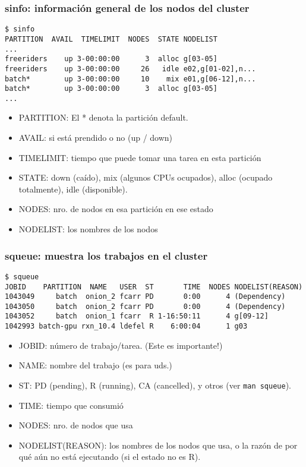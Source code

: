 \documentclass[handout]{beamer}
\begin{document}
\begin{frame}[fragile]
\frametitle{sinfo: información general de los nodos del cluster}

\begin{verbatim}
$ sinfo
PARTITION  AVAIL  TIMELIMIT  NODES  STATE NODELIST
...
freeriders    up 3-00:00:00      3  alloc g[03-05]
freeriders    up 3-00:00:00     26   idle e02,g[01-02],n...
batch*        up 3-00:00:00     10    mix e01,g[06-12],n...
batch*        up 3-00:00:00      3  alloc g[03-05]
...
\end{verbatim}
\begin{itemize}
  \item PARTITION: El * denota la partición default.
  \item AVAIL: si está prendido o no (up / down)
  \item TIMELIMIT: tiempo que puede tomar una tarea en esta partición
  \item STATE: down (caído), mix (algunos CPUs ocupados), alloc (ocupado totalmente), idle (disponible).
  \item NODES: nro. de nodos en esa partición en ese estado
  \item NODELIST: los nombres de los nodos
\end{itemize}
\end{frame}



\begin{frame}[fragile]
\frametitle{squeue: muestra los trabajos en el cluster}

\begin{verbatim}
$ squeue
JOBID    PARTITION  NAME   USER  ST       TIME  NODES NODELIST(REASON)
1043049     batch  onion_2 fcarr PD       0:00      4 (Dependency)
1043050     batch  onion_2 fcarr PD       0:00      4 (Dependency)
1043052     batch  onion_1 fcarr  R 1-16:50:11      4 g[09-12]
1042993 batch-gpu rxn_10.4 ldefel R    6:00:04      1 g03
\end{verbatim}
\begin{itemize}
  \item JOBID: número de trabajo/tarea. (Este es importante!)
  \item NAME: nombre del trabajo (es para uds.)
  \item ST: PD (pending), R (running), CA (cancelled), y otros (ver \Verb=man squeue=).
  \item TIME: tiempo que consumió
  \item NODES: nro. de nodos que usa
  \item NODELIST(REASON): los nombres de los nodos que usa, o la razón de por qué aún no está ejecutando (si el estado no es R).
\end{itemize}
\end{frame}
\end{document}
